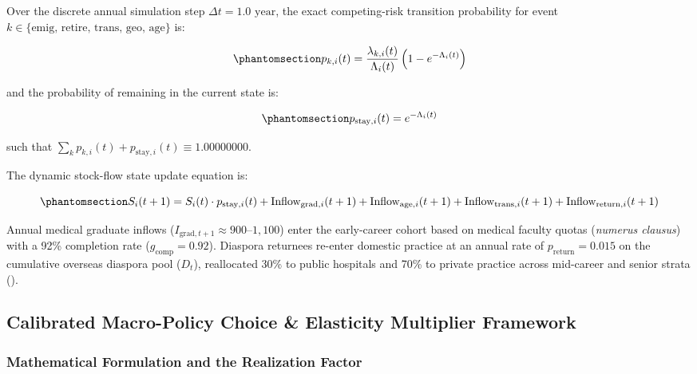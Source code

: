 \documentclass[
  11pt,
  a4paper]{article}
\begin{document}
Over the discrete annual simulation step \(\Delta t = 1.0\text{ year}\),
the exact competing-risk transition probability for event
\(k \in \{\text{emig, retire, trans, geo, age}\}\) is:

\begin{equation}\protect\phantomsection\label{eq-competing-risk-prob}{p_{k, i}(t) = \frac{\lambda_{k, i}(t)}{\Lambda_i(t)} \left( 1 - e^{-\Lambda_i(t)} \right)}\end{equation}

and the probability of remaining in the current state is:

\begin{equation}\protect\phantomsection\label{eq-stay-prob}{p_{\text{stay}, i}(t) = e^{-\Lambda_i(t)}}\end{equation}

such that
\(\sum_{k} p_{k, i}(t) + p_{\text{stay}, i}(t) \equiv 1.00000000\).

The dynamic stock-flow state update equation is:

\begin{equation}\protect\phantomsection\label{eq-stock-update}{S_i(t+1) = S_i(t) \cdot p_{\text{stay}, i}(t) + \text{Inflow}_{\text{grad}, i}(t+1) + \text{Inflow}_{\text{age}, i}(t+1) + \text{Inflow}_{\text{trans}, i}(t+1) + \text{Inflow}_{\text{return}, i}(t+1)}\end{equation}

Annual medical graduate inflows
(\(I_{\text{grad}, t+1} \approx 900–1,100\)) enter the early-career
cohort based on medical faculty quotas (\emph{numerus clausus}) with a
92\% completion rate (\(g_{\text{comp}} = 0.92\)). Diaspora returnees
re-enter domestic practice at an annual rate of
\(p_{\text{return}} = 0.015\) on the cumulative overseas diaspora pool
(\(D_t\)), reallocated 30\% to public hospitals and 70\% to private
practice across mid-career and senior strata
().

\subsection{Calibrated Macro-Policy Choice \& Elasticity Multiplier
Framework}\label{sec-methods-rum}

\subsubsection{Mathematical Formulation and the Realization
Factor}\label{mathematical-formulation-and-the-realization-factor}
\end{document}
